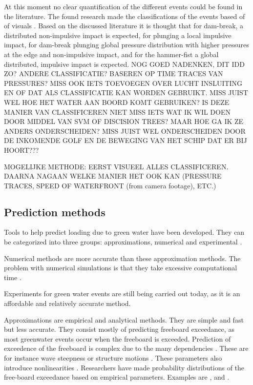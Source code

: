 \par 
At this moment no clear quantification of the different events could be found in the literature. The found research made the classifications of the events based of of visuals \cite{Greco2007, Chuang2019, Zhang2019}. Based on the discussed literature it is thought that for dam-break, a distributed non-impulsive impact is expected, for plunging a local impulsive impact, for dam-break plunging global pressure distribution with higher pressures at the edge and non-impulsive impact, and for the hammer-fist a global distributed, impulsive impact is expected. NOG GOED NADENKEN, DIT IDD ZO? ANDERE CLASSIFICATIE? BASEREN OP TIME TRACES VAN PRESSURES? MISS OOK IETS TOEVOEGEN OVER LUCHT INSLUITING EN OF DAT ALS CLASSIFICATIE KAN WORDEN GEBRUIKT. MISS JUIST WEL HOE HET WATER AAN BOORD KOMT GEBRUIKEN? IS DEZE MANIER VAN CLASSIFICEREN NIET MISS IETS WAT IK WIL DOEN DOOR MIDDEL VAN SVM OF DISCISION TREES? MAAR HOE GA IK ZE ANDERS ONDERSCHEIDEN? MISS JUIST WEL ONDERSCHEIDEN DOOR DE INKOMENDE GOLF EN DE BEWEGING VAN HET SCHIP DAT ER BIJ HOORT??? \par
MOGELIJKE METHODE: EERST VISUEEL ALLES CLASSIFICEREN. DAARNA NAGAAN WELKE MANIER HET OOK KAN (PRESSURE TRACES, SPEED OF WATERFRONT (from camera footage), ETC.)

\subsection{Prediction methods}
Tools to help predict loading due to green water have been developed. They can be categorized into three groups: approximations, numerical and experimental \cite{ISSC2012}. 
\par 
Numerical methods are more accurate than these approximation methods. The problem with numerical simulations is that they take excessive computational time \cite{Soares2015}.  
\par 
Experiments for green water events are still being carried out today, as it is an affordable and relatively accurate method.
\par 
Approximations are empirical and analytical methods. They are simple and fast but less accurate. They consist mostly of predicting freeboard exceedance, as most greenwater events occur when the freeboard is exceeded. 
Prediction of exceedence of the freeboard is complex due to the many dependencies \cite{Lee2020}. These are for instance wave steepness or structure motions \cite{Greco2001,Buchner2002}. These parameters also introduce nonlinearities \cite{Faltinsen2002}. Researchers have made probability distributions of the free-board exceedance based on empirical parameters. Examples are \citet{Buchner2002}, \citet{Cox2001} and \citet{Soares2005}. 



